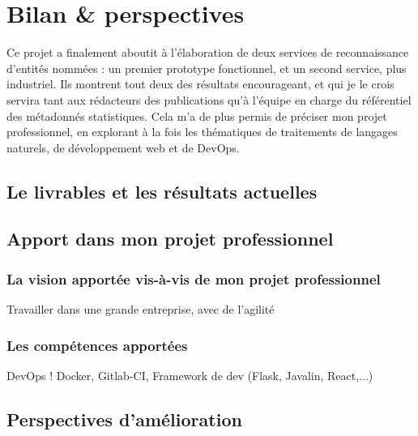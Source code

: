 \section{Bilan \& perspectives}
Ce projet a finalement aboutit à l'élaboration de deux services de reconnaissance d'entités nommées : un premier prototype fonctionnel, et un second service, plus industriel. Ils montrent tout deux des résultats encourageant, et qui je le crois servira tant aux rédacteurs des publications qu'à l'équipe en charge du référentiel des métadonnés statistiques. Cela m'a de plus permis de préciser mon projet professionnel, en explorant à la fois les thématiques de traitements de langages naturels, de développement web et de DevOps.

\subsection{Le livrables et les résultats actuelles}

\subsection{Apport dans mon projet professionnel}

\subsubsection{La vision apportée vis-à-vis de mon projet professionnel}
Travailler dans une grande entreprise, avec de l'agilité

\subsubsection{Les compétences apportées}
DevOps ! Docker, Gitlab-CI, Framework de dev (Flask, Javalin, React,...)

\subsection{Perspectives d'amélioration}